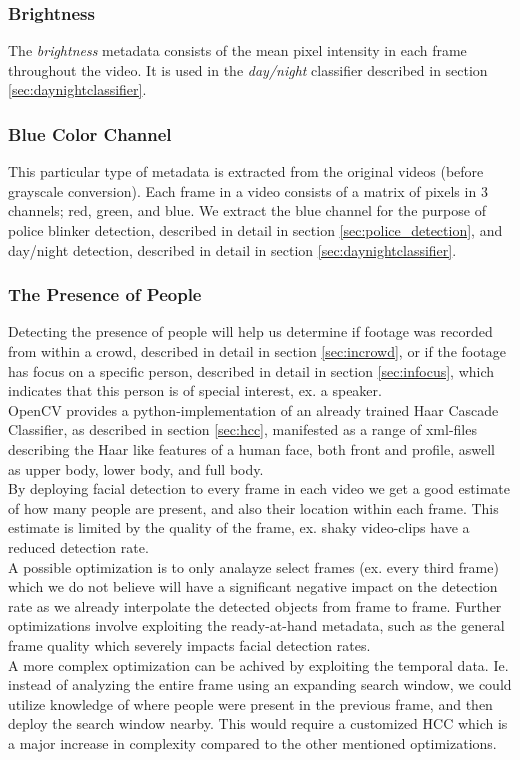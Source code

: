 \subsubsection{Brightness}\label{sec:brightnessdata}
%
The \textit{brightness} metadata consists of the mean pixel intensity in each frame throughout the video. It is used in the \textit{day/night} classifier described in section \ref{sec:daynightclassifier}.
%
\subsubsection{Blue Color Channel}\label{sec:blue_channel}
%
This particular type of metadata is extracted from the original videos (before grayscale conversion). Each frame in a video consists of a matrix of pixels in 3 channels; red, green, and blue. We extract the blue channel for the purpose of police blinker detection, described in detail in section \ref{sec:police_detection}, and day/night detection, described in detail in section \ref{sec:daynightclassifier}.
%
\subsubsection{The Presence of People}\label{sec:peopledata}
%
Detecting the presence of people will help us determine if footage was recorded from within a crowd, described in detail in section \ref{sec:incrowd}, or if the footage has focus on a specific person, described in detail in section \ref{sec:infocus}, which indicates that this person is of special interest, ex. a speaker.\\
OpenCV provides a python-implementation of an already trained Haar Cascade Classifier, as described in section \ref{sec:hcc}, manifested as a range of xml-files describing the Haar like features of a human face, both front and profile, aswell as upper body, lower body, and full body.\\
%
By deploying facial detection to every frame in each video we get a good estimate of how many people are present, and also their location within each frame. This estimate is limited by the quality of the frame, ex. shaky video-clips have a reduced detection rate.\\
%
A possible optimization is to only analayze select frames (ex. every third frame) which we do not believe will have a significant negative impact on the detection rate as we already interpolate the detected objects from frame to frame. Further optimizations involve exploiting the ready-at-hand metadata, such as the general frame quality which severely impacts facial detection rates.\\
A more complex optimization can be achived by exploiting the temporal data. Ie. instead of analyzing the entire frame using an expanding search window, we could utilize knowledge of where people were present in the previous frame, and then deploy the search window nearby. This would require a customized HCC which is a major increase in complexity compared to the other mentioned optimizations.
%
